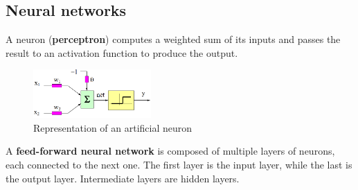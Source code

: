 \subsection{Neural networks}
A neuron (\textbf{perceptron}) computes a weighted sum of its inputs and 
passes the result to an activation function to produce the output.
\begin{figure}[H]
    \centering
    \includegraphics[width=0.40\textwidth]{img/neuron.png}
    \caption{Representation of an artificial neuron}
\end{figure}

A \textbf{feed-forward neural network} is composed of multiple layers of neurons, each connected to the next one.
The first layer is the input layer, while the last is the output layer.
Intermediate layers are hidden layers.


